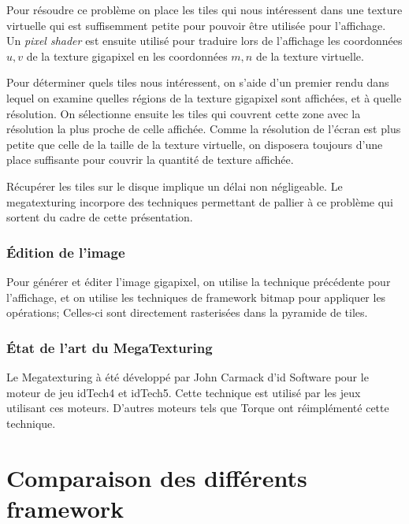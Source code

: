 			Pour résoudre ce problème on place les tiles qui nous intéressent dans une texture virtuelle qui est suffisemment petite pour pouvoir
			être utilisée pour l'affichage. Un \emph{pixel shader} est ensuite utilisé pour traduire lors de l'affichage les coordonnées $u,v$ de la
			texture gigapixel en les coordonnées $m,n$ de la texture virtuelle. 

			Pour déterminer quels tiles nous intéressent, on s'aide d'un premier rendu dans lequel on examine quelles régions de la texture gigapixel
			sont affichées, et à quelle résolution. On sélectionne ensuite les tiles qui couvrent cette zone avec la résolution la plus proche de celle
			affichée. Comme la résolution de l'écran est plus petite que celle de la taille de la texture virtuelle, on disposera toujours d'une place
			suffisante pour couvrir la quantité de texture affichée.

			Récupérer les tiles sur le disque implique un délai non négligeable. Le megatexturing incorpore des techniques permettant de pallier à
			ce problème qui sortent du cadre de cette présentation.

		\subsubsection{Édition de l'image}
			Pour générer et éditer l'image gigapixel, on utilise la technique précédente pour l'affichage, et on utilise les techniques de framework 
			bitmap pour appliquer les opérations; Celles-ci sont directement rasterisées dans la pyramide de tiles.
		\subsubsection{État de l'art du MegaTexturing}
			Le Megatexturing à été développé par John Carmack d'id Software pour le moteur de jeu idTech4 et idTech5. Cette technique est utilisé
			par les jeux utilisant ces moteurs. D'autres moteurs tels que Torque ont réimplémenté cette technique.

	\section{Comparaison des différents framework}

